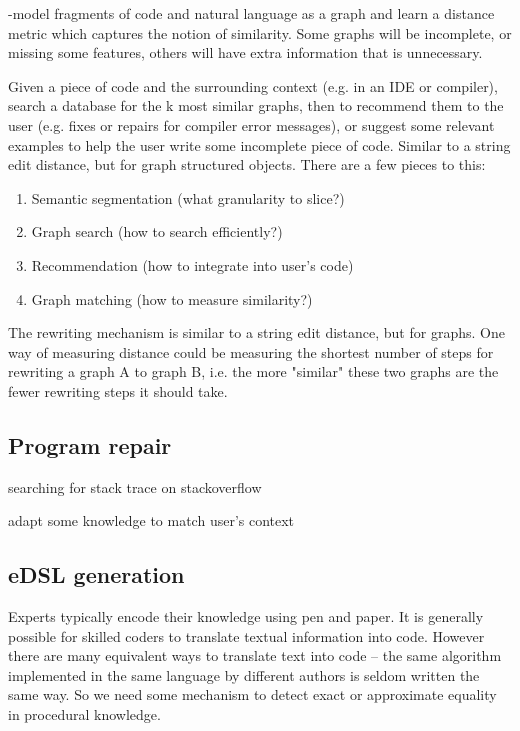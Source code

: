 \documentclass[11pt]{article}
\begin{document}
    -model fragments of code and natural language as a graph and learn a distance metric which captures the notion of similarity. Some graphs will be incomplete, or missing some features, others will have extra information that is unnecessary.

    Given a piece of code and the surrounding context (e.g. in an IDE or compiler), search a database for the k most similar graphs, then to recommend them to the user (e.g. fixes or repairs for compiler error messages), or suggest some relevant examples to help the user write some incomplete piece of code. Similar to a string edit distance, but for graph structured objects. There are a few pieces to this:

    \begin{enumerate}
        \item Semantic segmentation (what granularity to slice?)
        \item Graph search (how to search efficiently?)
        \item Recommendation (how to integrate into user's code)
        \item Graph matching (how to measure similarity?)
    \end{enumerate}

    The rewriting mechanism is similar to a string edit distance, but for graphs. One way of measuring distance could be measuring the shortest number of steps for rewriting a graph A to graph B, i.e. the more "similar" these two graphs are the fewer rewriting steps it should take.

    \subsection{Program repair}\label{subsec:prog-rep}

    searching for stack trace on stackoverflow

    adapt some knowledge to match user's context

    \subsection{eDSL generation}\label{subsec:gen}

    Experts typically encode their knowledge using pen and paper. It is generally possible for skilled coders to translate textual information into code. However there are many equivalent ways to translate text into code -- the same algorithm implemented in the same language by different authors is seldom written the same way. So we need some mechanism to detect exact or approximate equality in procedural knowledge.
\end{document}
